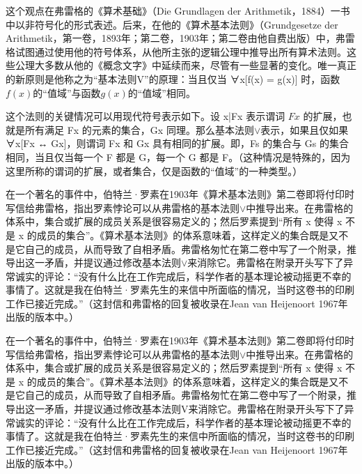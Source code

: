 这个观点在弗雷格的《算术基础》（Die Grundlagen der Arithmetik，1884）一书中以非符号化的形式表述。后来，在他的《算术基本法则》（Grundgesetze der Arithmetik，第一卷，1893年；第二卷，1903年；第二卷由他自费出版）中，弗雷格试图通过使用他的符号体系，从他所主张的逻辑公理中推导出所有算术法则。这些公理大多数从他的《概念文字》中延续而来，尽管有一些显著的变化。唯一真正的新原则是他称之为“基本法则V”的原理：当且仅当 ∀x[f(x) = g(x)] 时，函数$f(x)$的“值域”与函数$g(x)$的“值域”相同。

这个法则的关键情况可以用现代符号表示如下。设 {x|Fx} 表示谓词 $Fx$ 的扩展，也就是所有满足 Fx 的元素的集合，Gx 同理。那么基本法则\(\lor\)表示，如果且仅如果 ∀x[Fx ↔ Gx]，则谓词 Fx 和 Gx 具有相同的扩展。即，Fs 的集合与 Gs 的集合相同，当且仅当每一个 F 都是 G，每一个 G 都是 F。（这种情况是特殊的，因为这里所称的谓词的扩展，或者集合，仅是函数的“值域”的一种类型。）

在一个著名的事件中，伯特兰·罗素在1903年《算术基本法则》第二卷即将付印时写信给弗雷格，指出罗素悖论可以从弗雷格的基本法则\(\lor\)中推导出来。在弗雷格的体系中，集合或扩展的成员关系是很容易定义的；然后罗素提到“所有 x 使得 x 不是 x 的成员的集合”。《算术基本法则》的体系意味着，这样定义的集合既是又不是它自己的成员，从而导致了自相矛盾。弗雷格匆忙在第二卷中写了一个附录，推导出这一矛盾，并提议通过修改基本法则\(\lor\)来消除它。弗雷格在附录开头写下了异常诚实的评论：“没有什么比在工作完成后，科学作者的基本理论被动摇更不幸的事情了。这就是我在伯特兰·罗素先生的来信中所面临的情况，当时这卷书的印刷工作已接近完成。”（这封信和弗雷格的回复被收录在Jean van Heijenoort 1967年出版的版本中。）

在一个著名的事件中，伯特兰·罗素在1903年《算术基本法则》第二卷即将付印时写信给弗雷格，指出罗素悖论可以从弗雷格的基本法则\(\lor\)中推导出来。在弗雷格的体系中，集合或扩展的成员关系是很容易定义的；然后罗素提到“所有 x 使得 x 不是 x 的成员的集合”。《算术基本法则》的体系意味着，这样定义的集合既是又不是它自己的成员，从而导致了自相矛盾。弗雷格匆忙在第二卷中写了一个附录，推导出这一矛盾，并提议通过修改基本法则V来消除它。弗雷格在附录开头写下了异常诚实的评论：“没有什么比在工作完成后，科学作者的基本理论被动摇更不幸的事情了。这就是我在伯特兰·罗素先生的来信中所面临的情况，当时这卷书的印刷工作已接近完成。”（这封信和弗雷格的回复被收录在Jean van Heijenoort 1967年出版的版本中。）

